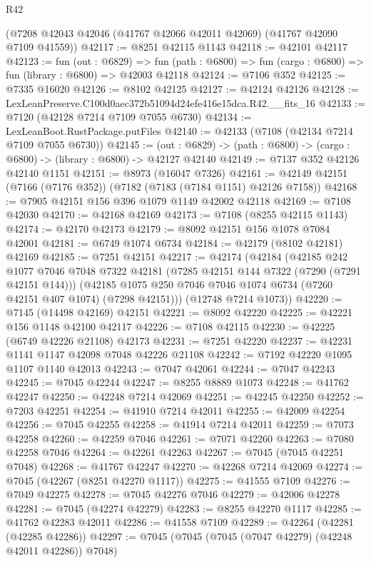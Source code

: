 \begin{lexlean}{R42}
\begin{coremodule}
{    (@7208 @42043 @42046 (@41767 @42066 @42011 @42069) (@41767 @42090 @7109 @41559))
@42117 := @8251 @42115 @1143
@42118 := @42101 @42117
@42123 := fun (out : @6829) =>
  fun (path : @6800) => fun (cargo : @6800) => fun (library : @6800) => @42003 @42118
@42124 := @7106 @352
@42125 := @7335 @16020
@42126 := @8102 @42125
@42127 := @42124 @42126
@42128 := LexLeanPreserve.C100d0aec372b51094d24efe416e15dca.R42.__fits_16
@42133 := @7120 (@42128 @7214 @7109 @7055 @6730)
@42134 := LexLeanBoot.RustPackage.putFiles
@42140 := @42133 (@7108 (@42134 @7214 @7109 @7055 @6730))
@42145 := (out : @6829) -> (path : @6800) -> (cargo : @6800) -> (library : @6800) -> @42127 @42140
@42149 := @7137 @352 @42126 @42140 @1151
@42151 := @8973 (@16047 @7326)
@42161 := @42149 @42151 (@7166 (@7176 @352)) (@7182 (@7183 (@7184 @1151) @42126 @7158))
@42168 := @7905 @42151 @156 @396 @1079 @1149 @42002 @42118
@42169 := @7108 @42030
@42170 := @42168 @42169
@42173 := @7108 (@8255 @42115 @1143)
@42174 := @42170 @42173
@42179 := @8092 @42151 @156 @1078 @7084 @42001
@42181 := @6749 @1074 @6734
@42184 := @42179 (@8102 @42181) @42169
@42185 := @7251 @42151
@42217 := @42174
    (@42184
      (@42185
        @242
        @1077
        @7046
        @7048
        @7322
        @42181
        (@7285 @42151 @144 @7322 (@7290 (@7291 @42151 @144)))
        (@42185 @1075 @250 @7046 @7046 @1074 @6734 (@7260 @42151 @407 @1074) (@7298 @42151)))
      (@12748 @7214 @1073))
@42220 := @7145 (@14498 @42169) @42151
@42221 := @8092 @42220
@42225 := @42221 @156 @1148 @42100 @42117
@42226 := @7108 @42115
@42230 := @42225 (@6749 @42226 @21108) @42173
@42231 := @7251 @42220
@42237 := @42231 @1141 @1147 @42098 @7048 @42226 @21108
@42242 := @7192 @42220 @1095 @1107 @1140 @42013
@42243 := @7047 @42061
@42244 := @7047 @42243
@42245 := @7045 @42244
@42247 := @8255 @8889 @1073
@42248 := @41762 @42247
@42250 := @42248 @7214 @42069
@42251 := @42245 @42250
@42252 := @7203 @42251
@42254 := @41910 @7214 @42011
@42255 := @42009 @42254
@42256 := @7045 @42255
@42258 := @41914 @7214 @42011
@42259 := @7073 @42258
@42260 := @42259 @7046
@42261 := @7071 @42260
@42263 := @7080 @42258 @7046
@42264 := @42261 @42263
@42267 := @7045 (@7045 @42251 @7048)
@42268 := @41767 @42247
@42270 := @42268 @7214 @42069
@42274 := @7045 (@42267 (@8251 @42270 @1117))
@42275 := @41555 @7109
@42276 := @7049 @42275
@42278 := @7045 @42276 @7046
@42279 := @42006 @42278
@42281 := @7045 (@42274 @42279)
@42283 := @8255 @42270 @1117
@42285 := @41762 @42283 @42011
@42286 := @41558 @7109
@42289 := @42264 (@42281 (@42285 @42286))
@42297 := @7045 (@7045 (@7045 (@7047 @42279) (@42248 @42011 @42286)) @7048)
}
\end{coremodule}
\end{lexlean}
